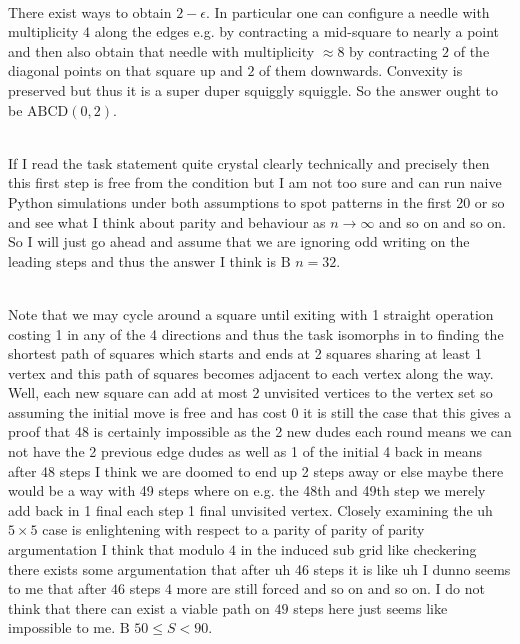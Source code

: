 
 \\
There exist ways to obtain $2-\epsilon$. In particular one can configure a needle with multiplicity $4$ along the edges e.g. by contracting a mid-square to nearly a point and then also obtain that needle with multiplicity $\approx 8$ by contracting $2$ of the diagonal points on that square up and $2$ of them downwards. Convexity is preserved but thus it is a super duper squiggly squiggle. So the answer ought to be $\boxed{\text{ABCD} (0,2)}$.


 \\
If I read the task statement quite crystal clearly technically and precisely then this first step is free from the condition but I am not too sure and can run naive Python simulations under both assumptions to spot patterns in the first 20 or so and see what I think about parity and behaviour as $n \to \infty$ and so on and so on. So I will just go ahead and assume that we are ignoring odd writing on the leading steps and thus the answer I think is $\boxed{\text{B }n=32}$.

 \\
Note that we may cycle around a square until exiting with 1 straight operation costing 1 in any of the 4 directions and thus the task isomorphs in to finding the shortest path of squares which starts and ends at 2 squares sharing at least 1 vertex and this path of squares becomes adjacent to each vertex along the way. Well, each new square can add at most 2 unvisited vertices to the vertex set so assuming the initial move is free and has cost 0 it is still the case that this gives a proof that 48 is certainly impossible as the 2 new dudes each round means we can not have the 2 previous edge dudes as well as 1 of the initial 4 back in means after 48 steps I think we are doomed to end up 2 steps away or else maybe there would be a way with 49 steps where on e.g. the 48th and 49th step we merely add back in 1 final each step 1 final unvisited vertex. Closely examining the uh $5 \times 5$ case is enlightening with respect to a parity of parity of parity argumentation I think that modulo $4$ in the induced sub grid like checkering there exists some argumentation that after uh 46 steps it is like uh I dunno seems to me that after $46$ steps $4$ more are still forced and so on and so on. I do not think that there can exist a viable path on $49$ steps here just seems like impossible to me. $\boxed{\text{B }50 \le S < 90}$.

